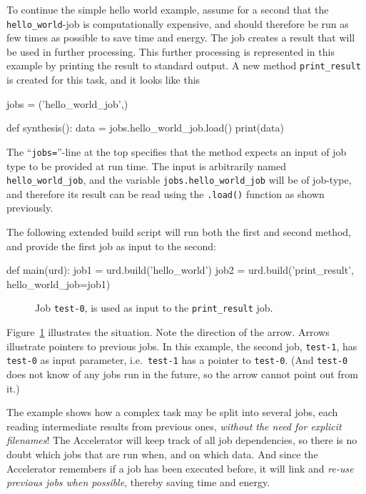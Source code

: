To continue the simple hello world example, assume for a second that
the \texttt{hello\_world}-job is computationally expensive, and should
therefore be run as few times as possible to save time and energy.
The job creates a result that will be used in further processing.
This further processing is represented in this example by printing the
result to standard output.  A new method \texttt{print\_result} is
created for this task, and it looks like this
\begin{python}
jobs = ('hello_world_job',)

def synthesis():
    data = jobs.hello_world_job.load() 
    print(data)
\end{python}
The ``\texttt{jobs=}''-line at the top specifies that the method
expects an input of job type to be provided at run time.  The input is
arbitrarily named \texttt{hello\_world\_job}, and the variable
\texttt{jobs.hello\_world\_job} will be of job-type, and therefore its
result can be read using the \texttt{.load()} function as shown
previously.

\clearpage
The following extended build script will run both the first and second
method, and provide the first job as input to the second:
\begin{python}
def main(urd):
    job1 = urd.build('hello_world')
    job2 = urd.build('print_result', hello_world_job=job1)
\end{python}

\begin{figure}[t]
    \hspace{1.5cm}
    \caption{Job \texttt{test-0}, is used as input to the
      \texttt{print\_result} job.}
    \label{fig:execflow-print-result}
\end{figure}

Figure~\ref{fig:execflow-print-result} illustrates the situation.
Note the direction of the arrow.  Arrows illustrate pointers to
previous jobs.  In this example, the second job, \texttt{test-1}, has
\texttt{test-0} as input parameter, i.e.\ \texttt{test-1} has a
pointer to \texttt{test-0}.  (And \texttt{test-0} does not know of any
jobs run in the future, so the arrow cannot point out from it.)

The example shows how a complex task may be split into several jobs,
each reading intermediate results from previous ones, \emph{without
the need for explicit filenames}!  The Accelerator will keep track of
all job dependencies, so there is no doubt which jobs that are run
when, and on which data.  And since the Accelerator remembers if a job
has been executed before, it will link and \emph{re-use previous jobs
when possible}, thereby saving time and energy.


